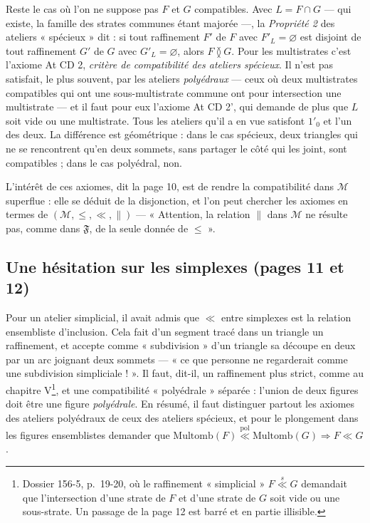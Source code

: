 \documentclass[11pt,a4paper]{article}
\begin{document}
Reste le cas où l'on ne suppose pas $F$ et $G$ compatibles. Avec $L = F \cap G$
--- qui existe, la famille des strates communes étant majorée ---, la
\emph{Propriété 2} des ateliers « spécieux » dit : si tout raffinement $F'$ de $F$
avec $F'_{L} = \varnothing$ est disjoint de tout raffinement $G'$ de $G$ avec
$G'_{L} = \varnothing$, alors $F \between G$. Pour les multistrates c'est l'axiome
At CD 2, \emph{critère de compatibilité des ateliers spécieux}. Il n'est pas
satisfait, le plus souvent, par les ateliers \emph{polyédraux} --- ceux où deux
multistrates compatibles qui ont une sous-multistrate commune ont pour
intersection une multistrate --- et il faut pour eux l'axiome At CD 2', qui
demande de plus que $L$ soit vide ou une multistrate. Tous les ateliers qu'il a
en vue satisfont $1'_{0}$ et l'un des deux. La différence est géométrique : dans
le cas spécieux, deux triangles qui ne se rencontrent qu'en deux sommets, sans
partager le côté qui les joint, sont compatibles ; dans le cas polyédral, non.

L'intérêt de ces axiomes, dit la page 10, est de rendre la compatibilité dans
$\mathcal{M}$ superflue : elle se déduit de la disjonction, et l'on peut chercher
les axiomes en termes de $(\mathcal{M}, \leq, \ll, \parallel)$ --- « Attention,
la relation $\parallel$ dans $\mathcal{M}$ ne résulte pas, comme dans
$\mathfrak{F}$, de la seule donnée de $\leq$ ».

\subsection*{Une hésitation sur les simplexes (pages 11 et 12)}

Pour un atelier simplicial, il avait admis que $\ll$ entre simplexes est la
relation ensembliste d'inclusion. Cela fait d'un segment tracé dans un triangle
un raffinement, et accepte comme « subdivision » d'un triangle sa découpe en
deux par un arc joignant deux sommets --- « ce que personne ne regarderait comme
une subdivision simpliciale ! ». Il faut, dit-il, un raffinement plus strict,
comme au chapitre V\footnote{Dossier 156-5, p.~19-20, où le raffinement
« simplicial » $F \overset{s}{\ll} G$ demandait que l'intersection d'une strate
de $F$ et d'une strate de $G$ soit vide ou une sous-strate. Un passage de la page
12 est barré et en partie illisible.}, et une compatibilité « polyédrale »
séparée : l'union de deux figures doit être une figure \emph{polyédrale}. En
résumé, il faut distinguer partout les axiomes des ateliers polyédraux de ceux
des ateliers spécieux, et pour le plongement dans les figures ensemblistes
demander que $\mathrm{Multomb}(F) \overset{\mathrm{pol}}{\ll} \mathrm{Multomb}(G)
\Rightarrow F \ll G$.
\end{document}
